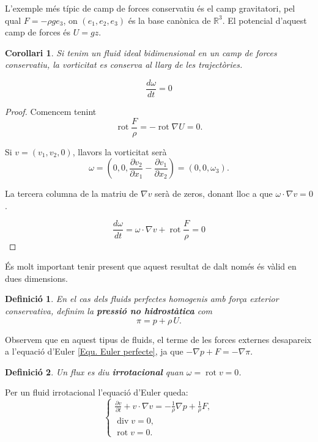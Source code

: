 \documentclass{article}
\numberwithin{equation}{section}
\DeclareMathOperator{\diver}{div}
\DeclareMathOperator{\rot}{rot}
\newtheorem{corollari}{Corol\textperiodcentered lari}[section]
\newtheorem{definicio}{Definici\'{o}}[section]
\begin{document}
L'exemple m\'{e}s t\'{i}pic de camp de forces conservatiu \'{e}s el camp gravitatori, pel qual $F=-\rho g e_3$, on $(e_1,e_2,e_3)$ \'{e}s la base can\`{o}nica de $\mathbb{R}^3$. El potencial d'aquest camp de forces \'{e}s $U=gz$.

\begin{corollari}\label{Cor: vorticitat 2D}
Si tenim un fluid ideal bidimensional en un camp de forces conservatiu, la vorticitat es conserva al llarg de les traject\`{o}ries.

\[\frac{d\omega}{dt}=0\]
\end{corollari}
\begin{proof}
Comencem tenint
\[\rot\frac{F}{\rho}=-\rot\nabla U=0.\]

Si $v=(v_1,v_2,0)$, llavors la vorticitat ser\`{a}
\[\omega=\left(0,0,\frac{\partial v_2}{\partial x_1}-\frac{\partial v_1}{\partial x_2}\right)=(0,0,\omega_3).\]

La tercera columna de la matriu de $\nabla v$ ser\`{a} de zeros, donant lloc a que $\omega\cdot\nabla v=0$.

\[\frac{d\omega}{dt}=\omega\cdot\nabla v+\rot\frac{F}{\rho}=0\]
\end{proof}

\'{E}s molt important tenir present que aquest resultat de dalt nom\'{e}s \'{e}s v\`{a}lid en dues dimensions.

\begin{definicio}\label{Def: pressio no hidrostatica}
En el cas dels fluids perfectes homogenis amb for\c{c}a exterior conservativa, definim la \textbf{pressi\'{o} no hidrost\`{a}tica} com
\begin{equation}
\pi=p+\rho\,U.
\end{equation}
\end{definicio}

Observem que en aquest tipus de fluids, el terme de les forces externes desapareix a l'equaci\'{o} d'Euler \ref{Equ. Euler perfecte}, ja que $-\nabla p+F=-\nabla\pi$.

\begin{definicio}
Un flux es diu \textbf{irrotacional} quan $\omega=\rot v=0$.
\end{definicio}

Per un fluid irrotacional l'equaci\'{o} d'Euler queda:
\[\left\{\begin{array}{l}\displaystyle{\frac{\partial v}{\partial t}+v\cdot\nabla v=-\frac{1}{\rho}\nabla p+\frac{1}{\rho}F,}\\\diver v=0,\\\rot v=0.\end{array}\right.\]
\end{document}
